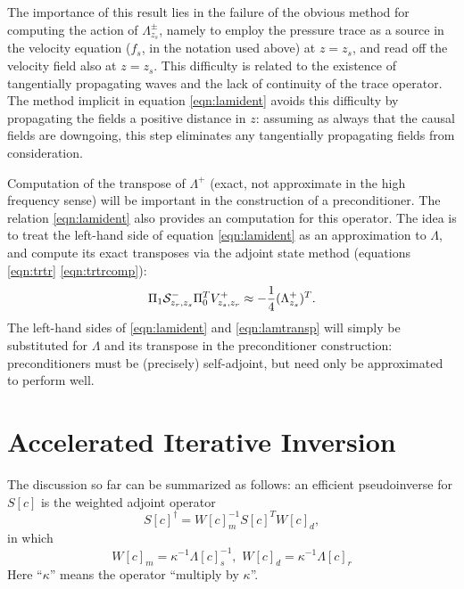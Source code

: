 The importance of this result lies in the failure of the obvious
method for computing the action of $\Lambda^{\pm}_{z_s}$, namely to
employ the pressure trace as a source in the velocity equation ($f_s$,
in the notation used above) at $z=z_s$, and read off the velocity
field also at $z=z_s$. This difficulty is related to the existence of
tangentially propagating waves and the lack of continuity of the trace
operator. The method implicit in equation \ref{eqn:lamident} avoids
this difficulty by propagating the fields a positive distance in $z$:
assuming as always that the causal fields are downgoing, this step
eliminates any tangentially propagating fields from consideration.

Computation of the transpose of $\Lambda^+$ (exact, not approximate in
the high frequency sense) will be important in the
construction of a preconditioner. The relation \ref{eqn:lamident} also
provides an computation for this operator. The idea is to treat the
left-hand side of equation \ref{eqn:lamident} as an approximation to
$\Lambda$, and compute its exact transposes via the adjoint state
method (equations \ref{eqn:trtr} \ref{eqn:trtrcomp}):
\begin{equation}
  \label{eqn:lamtransp}
   \Pi_1 {\cal S}^-_{z_r,z_s}\Pi_0^T V^{+}_{z_s,z_r} \approx -\frac{1}{4}(\Lambda^+_{z_s})^T.
\end{equation} 
The left-hand sides of \ref{eqn:lamident} and \ref{eqn:lamtransp} will
simply be substituted for $\Lambda$ and its transpose in the
preconditioner construction: preconditioners must be (precisely)
self-adjoint, but need only be approximated to perform well.

\section{Accelerated Iterative Inversion}

The discussion so far can be summarized as follows: an efficient pseudoinverse for $S[c]$ is the weighted adjoint operator
\begin{equation}
\label{eqn:wadj}
S[c]^{\dagger} = W[c]_m^{-1}S[c]^TW[c]_d,
\end{equation}
in which 
\begin{equation}
\label{eqn:weights}
W[c]_m = \kappa^{-1}\Lambda[c]^{-1}_s,\,\, W[c]_d = \kappa^{-1}\Lambda[c]_r
\end{equation}
Here ``$\kappa$'' means the operator ``multiply by $\kappa$''.


